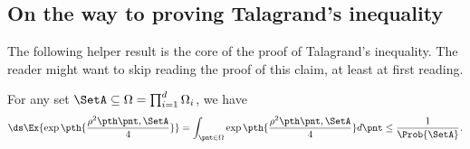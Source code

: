 \subsection{On the way to proving Talagrand's inequality}

The following helper result is the core of the proof of Talagrand's
inequality. The reader might want to skip reading the proof of this
claim, at least at first reading.

\begin{theorem}
    For any set $\SetA \subseteq \Omega = \prod_{i=1}^d \Omega_i$, we
    have
    \begin{equation*}
        \ds \Ex{ \exp \pth{\frac{\distTSqY{\pnt}{\SetA} }{4}}}%
        =%
        \int_{\pnt \in \Omega}\exp \pth{\frac{\distTSqY{\pnt}{\SetA}
           }{4}} d\pnt \leq%
        \frac{1}{\Prob{\SetA}}.
    \end{equation*}                   
\end{theorem}
